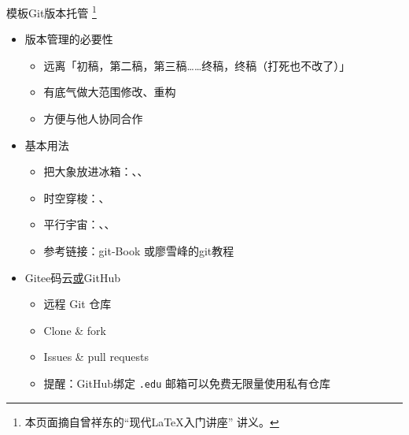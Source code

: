 \documentclass[fontset = none, xcolor=svgnames, t, aspectratio=169]{ctexbeamer}
\begin{document}
\begin{frame}[fragile]{\nwafuprojrep 模板}{Git版本托管
    \footnote[frame,1]{本页面摘自曾祥东的\enquote{现代\LaTeX 入门讲座}
      讲义。}}
  \stretchon
  \begin{itemize}
    \item 版本管理的必要性
      \begin{itemize}
        \item 远离「初稿，第二稿，第三稿……终稿，终稿（打死也不改了）」
        \item 有底气做大范围修改、重构
        \item 方便与他人协同合作
      \end{itemize}
    \item 基本用法
      \begin{itemize}
        \item 把大象放进冰箱：、、
        \item 时空穿梭：、
        \item 平行宇宙：、、
        \item 参考链接：git-Book
          或廖雪峰的git教程
      \end{itemize}
    \item Gitee码云\href{https://gitee.com}或GitHub \href{https://github.com}{\faGithub}
      \begin{itemize}
        \item 远程 Git 仓库
        \item Clone \& fork
        \item Issues \& pull requests
        \item \alert{提醒}：GitHub绑定 \texttt{.edu} 邮箱可以免费无限量使用私有仓库
      \end{itemize}
  \end{itemize}
  \stretchoff
\end{frame}

\end{document}
